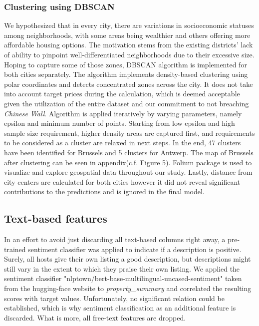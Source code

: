 \documentclass[11pt, oneside]{article}   	%
\begin{document}
\subsubsection{Clustering using DBSCAN}
We hypothesized that in every city, there are variations in socioeconomic statuses among neighborhoods, with some areas being wealthier and others offering more affordable housing options. The motivation stems from the existing districts' lack of ability to pinpoint well-differentiated neighborhoods due to their excessive size. Hoping to capture some of those zones, DBSCAN algorithm is implemented for both cities separately. The algorithm implements density-based clustering using polar coordinates and detects concentrated zones across the city. It does not take into account target prices during the calculation, which is deemed acceptable given the utilization of the entire dataset and our commitment to not breaching \textit{Chinese Wall}.\newline 
\indent Algorithm is applied iteratively by varying parameters, namely epsilon and minimum number of points. Starting from low epsilon and high sample size requirement, higher density areas are captured first, and requirements to be considered as a cluster are relaxed in next steps. In the end, 47 clusters have been identified for Brussels and 5 clusters for Antwerp.\newline 
\indent The map of Brussels after clustering can be seen in appendix(c.f. Figure 5). Folium package is used to visualize and explore geospatial data throughout our study. Lastly, distance from city centers are calculated for both cities however it did not reveal significant contributions to the predictions and is ignored in the final model.


\subsection{Text-based features}
In an effort to avoid just discarding all text-based columns right away, a pre-trained sentiment classifier was applied to indicate if a description is positive. Surely, all hosts give their own listing a good description, but descriptions might still vary in the extent to which they praise their own listing. We applied the sentiment classifier "nlptown/bert-base-multilingual-uncased-sentiment" taken from the hugging-face website to \textit{property\_summary} and correlated the resulting scores with target values. Unfortunately, no significant relation could be established, which is why sentiment classification as an additional feature is discarded. What is more, all free-text features are dropped.
\end{document}
